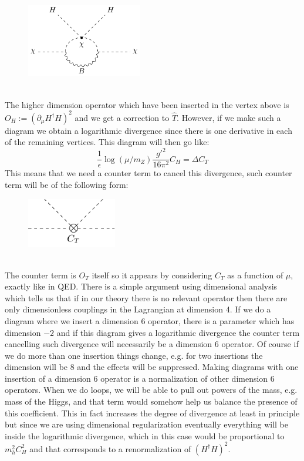 \documentclass[../main.tex]{subfiles}
\begin{document}
\begin{figure}[h]
    \centering
    \includegraphics[width=0.45\textwidth]{Images/t.pdf}
    \caption*{}
\end{figure}\\
The higher dimension operator which have been inserted in the vertex above is $O_H:=(\partial_\mu H^\dagger H)^2$ and we get a correction to $\hat{T}$. However, if we make such a diagram we obtain a logarithmic divergence since there is one derivative in each of the remaining vertices. This diagram will then go like:
\[
\frac{1}{\epsilon}\log(\mu/m_Z)\frac{g'^2}{16\pi^2}C_H=\Delta C_T
\]
This means that we need a counter term to cancel this divergence, such counter term will be of the following form:
\begin{figure}[h]
    \centering
    \includegraphics[width=0.35\textwidth]{Images/ct.pdf}
    \caption*{}
\end{figure}\\
The counter term is $O_T$ itself so it appears by considering $C_T$ as a function of $\mu$, exactly like in QED. There is a simple argument using dimensional analysis which tells us that if in our theory there is no relevant operator then there are only dimensionless couplings in the Lagrangian at dimension 4. If we do a diagram where we insert a dimension 6 operator, there is a parameter which has dimension $-2$ and if this diagram gives a logarithmic divergence the counter term cancelling such divergence will necessarily be a dimension 6 operator. Of course if we do more than one insertion things change, e.g. for two insertions the dimension will be 8 and the effects will be suppressed. Making diagrams with one insertion of a dimension 6 operator is a normalization of other dimension 6 operators. When we do loops, we will be able to pull out powers of the mass, e.g. mass of the Higgs, and that term would somehow help us balance the presence of this coefficient. This in fact increases the degree of divergence at least in principle but since we are using dimensional regularization eventually everything will be inside the logarithmic divergence, which in this case would be proportional to $m_h^2C_H^2$ and that corresponds to a renormalization of $(H^\dagger H)^2$.\\
\end{document}
